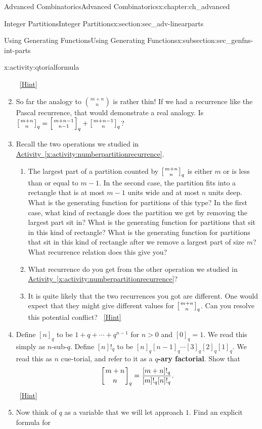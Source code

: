 \documentclass[oneside,10pt,]{book}
\newcommand{\terminology}[1]{\textbf{#1}}
\numberwithin{equation}{chapter}
\newcommand{\qchoose}[2]{\left[{#1\atop#2}\right]_q}
\begin{document}
\begin{chapterptx}{Advanced Combinatorics}{}{Advanced Combinatorics}{}{}{x:chapter:ch_advanced}
\begin{sectionptx}{Integer Partitions}{}{Integer Partitions}{}{}{x:section:sec_adv-linearparts}
\begin{subsectionptx}{Using Generating Functions}{}{Using Generating Functions}{}{}{x:subsection:sec_genfns-int-parts}
\begin{activity}{}{x:activity:qtorialformula}
\begin{enumerate}[font=\bfseries,label=(\alph*),ref=\alph*]
\qquad~\hfill{\tiny\hyperlink{g:hint:idm8010-back}{[Hint]}}\item{}So far the analogy to \(\binom{m+n}{n}\) is rather thin! If we had a recurrence like the Pascal recurrence, that would demonstrate a real analogy. Is \(\qchoose{m+n}{n}= \qchoose{m+n-1}{n-1}+\qchoose{m+n-1}{n}\)?%
\item{}Recall the two operations we studied in \hyperref[x:activity:numberpartitionrecurrence]{Activity~\ref{x:activity:numberpartitionrecurrence}}.%
\begin{enumerate}[font=\bfseries,label=(\roman*),ref=\theenumi.\roman*]
\item{}The largest part of a partition counted by \(\qchoose{m+n}{n}\) is either \(m\) or is less than or equal to \(m-1\).  In the second case, the partition fits into a rectangle that is at most \(m-1\) units wide and at most \(n\) units deep.  What is the generating function for partitions of this type?  In the first case, what kind of rectangle does the partition we get by removing the largest part sit in?  What is the generating function for partitions that sit in this kind of rectangle?  What is the generating function for partitions that sit in this kind of rectangle after we remove a largest part of size \(m\)?  What recurrence relation does this give you?%
\item{}What recurrence do you get from the other operation we studied in \hyperref[x:activity:numberpartitionrecurrence]{Activity~\ref{x:activity:numberpartitionrecurrence}}?%
\item{}It is quite likely that the two recurrences you got are different.  One would expect that they might give different values for \(\qchoose{m+n}{n}\).  Can you resolve this potential conflict?%
\qquad~\hfill{\tiny\hyperlink{g:hint:idm8078-back}{[Hint]}}\end{enumerate}
\item{}Define \([n]_q\) to be \(1+q+\cdots+q^{n-1}\) for \(n>0\) and \([0]_q =1\).  We read this simply as \(n\)-sub-\(q\). Define \([n]!_q\) to be \([n]_q[n-1]_q\cdots [3]_q[2]_q[1]_q\). We read this as \(n\) cue-torial, and refer to it as a \terminology{\(q\)-ary factorial}. Show that%
\begin{equation*}
\qchoose{m+n}{n} = \frac{[m+n]!_q}{[m]!_q[n]!_q}.
\end{equation*}
%
\qquad~\hfill{\tiny\hyperlink{g:hint:idm8104-back}{[Hint]}}\item{}Now think of \(q\) as a variable that we will let approach \(1\). Find an explicit formula for%

\end{enumerate}
\end{activity}
\end{subsectionptx}
\end{sectionptx}
\end{chapterptx}
\end{document}
